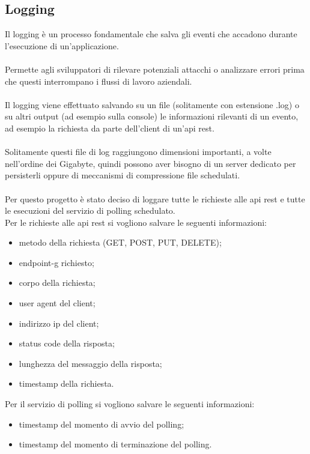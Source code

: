 \subsection{Logging}
Il logging è un processo fondamentale che salva gli eventi che accadono durante
l'esecuzione di un'applicazione.
\\\\
Permette agli sviluppatori di rilevare potenziali attacchi o analizzare
errori prima che questi interrompano i flussi di lavoro aziendali.
\\\\
Il logging viene effettuato salvando su un file (solitamente con estensione .log) o su altri output (ad esempio sulla console) le informazioni rilevanti
di un evento, ad esempio la richiesta da parte
dell'client di un'\gls{api} \gls{rest}.
\\\\
Solitamente questi file di log raggiungono dimensioni importanti, a volte nell'ordine dei Gigabyte, quindi possono aver bisogno di
un server dedicato per persisterli oppure di meccanismi di compressione file schedulati.
\\\\
Per questo progetto è stato deciso di loggare tutte le richieste alle \gls{api} \gls{rest}
e tutte le esecuzioni del servizio di polling schedulato.
\\
Per le richieste alle \gls{api} \gls{rest} si vogliono salvare le seguenti 
informazioni:
\begin{itemize}
    \item metodo della richiesta (GET, POST, PUT, DELETE);
    \item \gls{endpoint-g} richiesto;
    \item corpo della richiesta;
    \item user agent del client;
    \item indirizzo ip del client;
    \item status code della risposta;
    \item lunghezza del messaggio della risposta;
    \item timestamp della richiesta.
\end{itemize}
\leavevmode\newline
Per il servizio di polling si vogliono salvare le seguenti informazioni:
\begin{itemize}
    \item timestamp del momento di avvio del polling;
    \item timestamp del momento di terminazione del polling.
\end{itemize}
